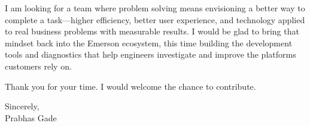 \documentclass[letterpaper,11pt]{letter}
\begin{document}
I am looking for a team where problem solving means envisioning a better way to complete a task---higher efficiency, better user experience, and technology applied to real business problems with measurable results. I would be glad to bring that mindset back into the Emerson ecosystem, this time building the development tools and diagnostics that help engineers investigate and improve the platforms customers rely on.

Thank you for your time. I would welcome the chance to contribute.

Sincerely,\\
Prabhas Gade
\end{document}
